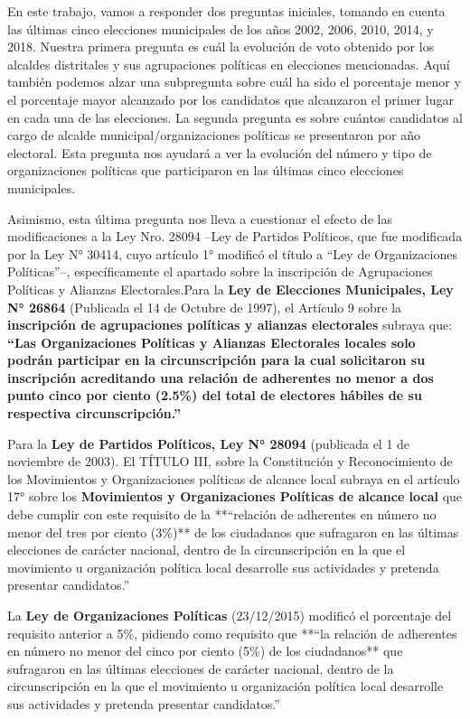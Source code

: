 \documentclass[
]{book}
\begin{document}
En este trabajo, vamos a responder dos preguntas iniciales, tomando en cuenta las últimas cinco elecciones municipales de los años 2002, 2006, 2010, 2014, y 2018. Nuestra primera pregunta es cuál la evolución de voto obtenido por los alcaldes distritales y sus agrupaciones políticas en elecciones mencionadas. Aquí también podemos alzar una subpregunta sobre cuál ha sido el porcentaje menor y el porcentaje mayor alcanzado por los candidatos que alcanzaron el primer lugar en cada una de las elecciones. La segunda pregunta es sobre cuántos candidatos al cargo de alcalde municipal/organizaciones políticas se presentaron por año electoral. Esta pregunta nos ayudará a ver la evolución del número y tipo de organizaciones políticas que participaron en las últimas cinco elecciones municipales.

Asimismo, esta última pregunta nos lleva a cuestionar el efecto de las modificaciones a la Ley Nro. 28094 --Ley de Partidos Políticos, que fue modificada por la Ley N° 30414, cuyo artículo 1° modificó el título a ``Ley de Organizaciones Políticas''--, específicamente el apartado sobre la inscripción de Agrupaciones Políticas y Alianzas Electorales.Para la \textbf{Ley de Elecciones Municipales, Ley N° 26864} (Publicada el 14 de Octubre de 1997), el Artículo 9 sobre la \textbf{inscripción de agrupaciones políticas y alianzas electorales} subraya que: \textbf{``Las Organizaciones Políticas y Alianzas Electorales locales solo podrán participar en la circunscripción para la cual solicitaron su inscripción acreditando una relación de adherentes no menor a dos punto cinco por ciento (2.5\%) del total de electores hábiles de su respectiva circunscripción.''}

Para la \textbf{Ley de Partidos Políticos, Ley N° 28094} (publicada el 1 de noviembre de 2003). El TÍTULO III, sobre la Constitución y Reconocimiento de los Movimientos y Organizaciones políticas de alcance local subraya en el artículo 17° sobre los \textbf{Movimientos y Organizaciones Políticas de alcance local} que debe cumplir con este requisito de la **``relación de adherentes en número no menor del tres por ciento (3\%)** de los ciudadanos que sufragaron en las últimas elecciones de carácter nacional, dentro de la circunscripción en la que el movimiento u organización política local desarrolle sus actividades y pretenda presentar candidatos.''

La \textbf{Ley de Organizaciones Políticas} (23/12/2015) modificó el porcentaje del requisito anterior a 5\%, pidiendo como requisito que **``la relación de adherentes en número no menor del cinco por ciento (5\%) de los ciudadanos** que sufragaron en las últimas elecciones de carácter nacional, dentro de la circunscripción en la que el movimiento u organización política local desarrolle sus actividades y pretenda presentar candidatos.''
\end{document}
